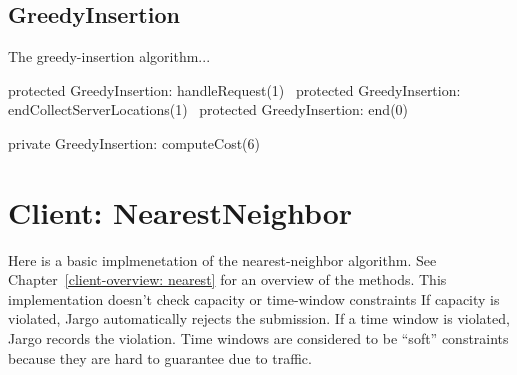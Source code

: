 \section{GreedyInsertion}
\label{client-overview: greedy}

The greedy-insertion algorithm...

\nwenddocs{}\endmoddef\nwstartdeflinemarkup{}\nwenddeflinemarkup
protected \LA{}GreedyInsertion: handleRequest(1)~{\nwtagstyle{}}\RA{}
protected \LA{}GreedyInsertion: endCollectServerLocations(1)~{\nwtagstyle{}}\RA{}
protected \LA{}GreedyInsertion: end(0)~{\nwtagstyle{}}\RA{}
\nwendcode{}\nwdocspar

\nwenddocs{}\plusendmoddef\nwstartdeflinemarkup{}\nwenddeflinemarkup
private \LA{}GreedyInsertion: computeCost(6)~{\nwtagstyle{}}\RA{}
\nwendcode{}\nwdocspar

\nwenddocs{}\chapter{Client: NearestNeighbor}
\label{client-nearest}

Here is a basic implmenetation of the nearest-neighbor algorithm. See
Chapter~\ref{client-overview: nearest} for an overview of the methods.  This
implementation doesn't check capacity or time-window constraints If capacity is
violated, Jargo automatically rejects the submission. If a time window is
violated, Jargo records the violation. Time windows are considered to be
``soft'' constraints because they are hard to guarantee due to traffic.

